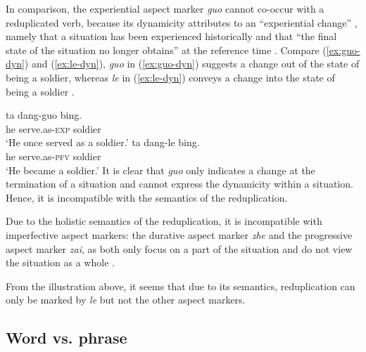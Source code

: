 In comparison, the experiential aspect marker \textit{guo} cannot co\hyp{}occur with a reduplicated verb, 
because its dynamicity attributes to an ``experiential change'' \citep[148]{XiaoMcEnery2004}, 
namely that a situation has been experienced historically and that ``the final state of the situation no longer obtains'' at the reference time \citep[144]{XiaoMcEnery2004}. 
Compare (\ref{ex:guo-dyn}) and (\ref{ex:le-dyn}), \textit{guo} in (\ref{ex:guo-dyn}) suggests a change out of the state of being a soldier, 
whereas \textit{le} in (\ref{ex:le-dyn}) conveys a change into the state of being a soldier \citep[149]{XiaoMcEnery2004}.

\ea
  \ea\label{ex:guo-dyn}
    \gll ta dang-guo bing.\\
    he serve.as-\textsc{exp} soldier\\ 
    \glt `He once served as a soldier.'
  \ex\label{ex:le-dyn}
    \gll ta dang-le bing.\\
    he serve.as-\textsc{pfv} soldier\\ 
    \glt `He became a soldier.'
  \z
\z
It is clear that \textit{guo} only indicates a change at the termination of a situation and cannot express the dynamicity within a situation.
Hence, it is incompatible with the semantics of the reduplication.

Due to the holistic semantics of the reduplication, it is incompatible with imperfective aspect markers: the durative aspect marker \textit{zhe} and the progressive aspect marker \textit{zai}, as both only focus on  a part of the situation and do not view the situation as a whole \citep[Ch. 5]{XiaoMcEnery2004}.

From the illustration above, it seems that due to its semantics, reduplication can only be marked by \textit{le} but not the other aspect markers.








\subsection{Word vs. phrase}\label{sec:word}


